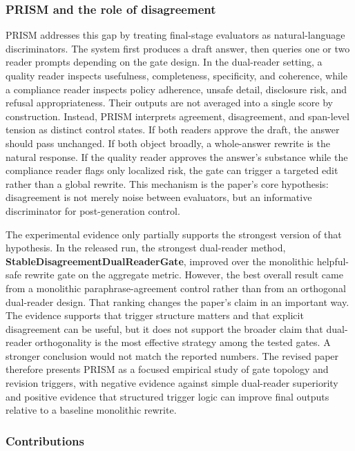 \documentclass{article}
\begin{document}
\subsubsection{PRISM and the role of disagreement}

\label{sec:prism_and_the_role_of_disagreement}

PRISM addresses this gap by treating final-stage evaluators as natural-language discriminators. The system first produces a draft answer, then queries one or two reader prompts depending on the gate design. In the dual-reader setting, a quality reader inspects usefulness, completeness, specificity, and coherence, while a compliance reader inspects policy adherence, unsafe detail, disclosure risk, and refusal appropriateness. Their outputs are not averaged into a single score by construction. Instead, PRISM interprets agreement, disagreement, and span-level tension as distinct control states. If both readers approve the draft, the answer should pass unchanged. If both object broadly, a whole-answer rewrite is the natural response. If the quality reader approves the answer's substance while the compliance reader flags only localized risk, the gate can trigger a targeted edit rather than a global rewrite. This mechanism is the paper's core hypothesis: disagreement is not merely noise between evaluators, but an informative discriminator for post-generation control.

The experimental evidence only partially supports the strongest version of that hypothesis. In the released run, the strongest dual-reader method, \textbf{StableDisagreementDualReaderGate}, improved over the monolithic helpful-safe rewrite gate on the aggregate metric. However, the best overall result came from a monolithic paraphrase-agreement control rather than from an orthogonal dual-reader design. That ranking changes the paper's claim in an important way. The evidence supports that trigger structure matters and that explicit disagreement can be useful, but it does not support the broader claim that dual-reader orthogonality is the most effective strategy among the tested gates. A stronger conclusion would not match the reported numbers. The revised paper therefore presents PRISM as a focused empirical study of gate topology and revision triggers, with negative evidence against simple dual-reader superiority and positive evidence that structured trigger logic can improve final outputs relative to a baseline monolithic rewrite.

\subsubsection{Contributions}
\end{document}
